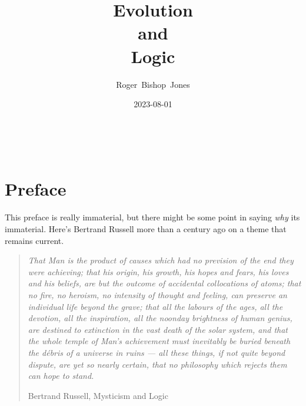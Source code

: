 \documentclass[10pt,titlepage]{article}
\title{\bf\LARGE Evolution\\ and\\ Logic}
\author{Roger~Bishop~Jones}
\date{\small 2023-08-01}
\newcommand{\ignore}[1]{}
\begin{document}
%
                               
\begin{titlepage}
\maketitle





\end{titlepage}

\ \

\ignore{
\begin{centering}
{}
\end{centering}
}%

\setcounter{tocdepth}{2}
{\parskip-0pt\tableofcontents}


\pagebreak

\section*{Preface}


This preface is really immaterial, but there might be some point in saying \emph{why} its immaterial.
Here's Bertrand Russell more than a century ago on a theme that remains current.

\begin{quote}
  \emph{That Man is the product of causes which had no prevision of the end they were achieving; that his origin, his growth, his hopes and fears, his loves and his beliefs, are but the outcome of accidental collocations of atoms; that no fire, no heroism, no intensity of thought and feeling, can preserve an individual life beyond the grave; that all the labours of the ages, all the devotion, all the inspiration, all the noonday brightness of human genius, are destined to extinction in the vast death of the solar system, and that the whole temple of Man's achievement must inevitably be buried beneath the débris of a universe in ruins — all these things, if not quite beyond dispute, are yet so nearly certain, that no philosophy which rejects them can hope to stand.}

Bertrand Russell, Mysticism and Logic \cite{russell17}
\end{quote}
\end{document}

